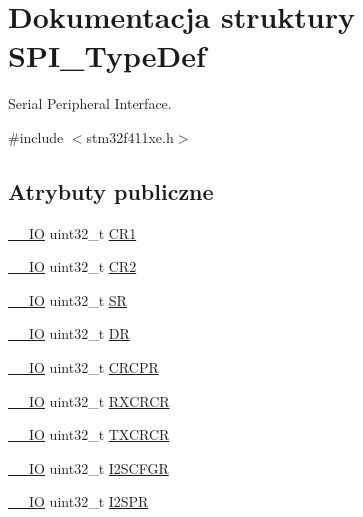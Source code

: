 \hypertarget{struct_s_p_i___type_def}{}\section{Dokumentacja struktury S\+P\+I\+\_\+\+Type\+Def}
\label{struct_s_p_i___type_def}


Serial Peripheral Interface.  




{\ttfamily \#include $<$stm32f411xe.\+h$>$}

\subsection*{Atrybuty publiczne}
\begin{DoxyCompactItemize}
\item 
\hyperlink{core__sc300_8h_aec43007d9998a0a0e01faede4133d6be}{\+\_\+\+\_\+\+IO} uint32\+\_\+t \hyperlink{struct_s_p_i___type_def_a6ecd5cb63b85c381bd67dc90dd4f573a}{C\+R1}
\item 
\hyperlink{core__sc300_8h_aec43007d9998a0a0e01faede4133d6be}{\+\_\+\+\_\+\+IO} uint32\+\_\+t \hyperlink{struct_s_p_i___type_def_a38cb89a872e456e6ecd29b6c71d85600}{C\+R2}
\item 
\hyperlink{core__sc300_8h_aec43007d9998a0a0e01faede4133d6be}{\+\_\+\+\_\+\+IO} uint32\+\_\+t \hyperlink{struct_s_p_i___type_def_a33f3dd6a505d06fe6c466b63be451891}{SR}
\item 
\hyperlink{core__sc300_8h_aec43007d9998a0a0e01faede4133d6be}{\+\_\+\+\_\+\+IO} uint32\+\_\+t \hyperlink{struct_s_p_i___type_def_a02ef206dd5bb270e1f17fedd71284422}{DR}
\item 
\hyperlink{core__sc300_8h_aec43007d9998a0a0e01faede4133d6be}{\+\_\+\+\_\+\+IO} uint32\+\_\+t \hyperlink{struct_s_p_i___type_def_a609d2a279b1927846a991deb9d0dc0b0}{C\+R\+C\+PR}
\item 
\hyperlink{core__sc300_8h_aec43007d9998a0a0e01faede4133d6be}{\+\_\+\+\_\+\+IO} uint32\+\_\+t \hyperlink{struct_s_p_i___type_def_a60f1f0e77c52e89cfd738999bee5c9d0}{R\+X\+C\+R\+CR}
\item 
\hyperlink{core__sc300_8h_aec43007d9998a0a0e01faede4133d6be}{\+\_\+\+\_\+\+IO} uint32\+\_\+t \hyperlink{struct_s_p_i___type_def_a0b5a7f6383eb478bbcc22a36c5e95ae6}{T\+X\+C\+R\+CR}
\item 
\hyperlink{core__sc300_8h_aec43007d9998a0a0e01faede4133d6be}{\+\_\+\+\_\+\+IO} uint32\+\_\+t \hyperlink{struct_s_p_i___type_def_a4a1547c0ed26f31108910c35d2876b83}{I2\+S\+C\+F\+GR}
\item 
\hyperlink{core__sc300_8h_aec43007d9998a0a0e01faede4133d6be}{\+\_\+\+\_\+\+IO} uint32\+\_\+t \hyperlink{struct_s_p_i___type_def_aff2f386a2566c722f7962377b495f1a2}{I2\+S\+PR}
\end{DoxyCompactItemize}



